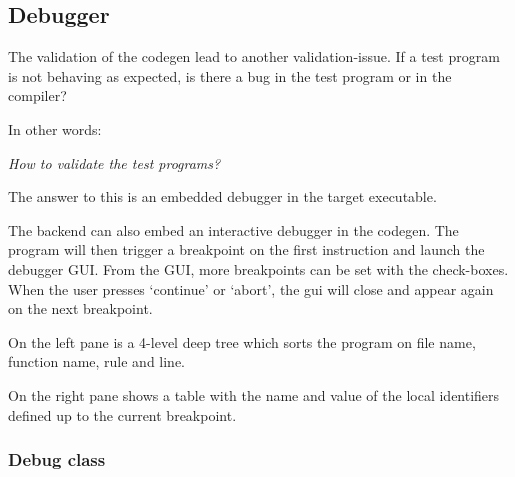 \subsection{Debugger}\label{debugger}
The validation of the codegen lead to another validation-issue.
If a test program is not behaving as expected, is there a bug in the test program or in the compiler?

In other words:

\textit{How to validate the test programs?}

The answer to this is an embedded debugger in the target executable.


The backend can also embed an interactive debugger in the codegen.
The program will then trigger a breakpoint on the first instruction and launch the debugger GUI.
From the GUI, more breakpoints can be set with the check-boxes.
When the user presses `continue' or `abort', the gui will close and appear again on the next breakpoint.

On the left pane is a 4-level deep tree which sorts the program on file name, function name, rule and line.

On the right pane shows a table with the name and value of the local identifiers defined up to the current breakpoint.

\subsubsection{Debug class}

